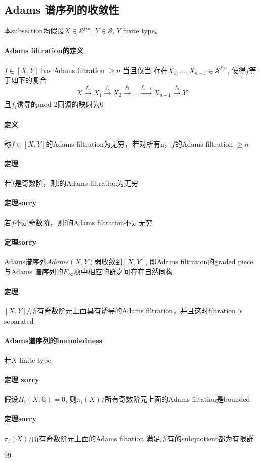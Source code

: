 \documentclass[12pt,a4paper]{article}
\begin{document}
\begin{sloppy}
\subsection{Adams 谱序列的收敛性}
本subsection均假设$X\in \mathcal{S}^{fin}$, $Y\in \mathcal{S}$, $Y$ finite type。
\paragraph{Adams filtration的定义}

$f\in [X,Y]$ has Adams filtration $\geq n$ 当且仅当
存在$X_1,\dots, X_{n-1} \in \mathcal{S}^{fin}$, 使得$f$等于如下的复合
$$X\xrightarrow[]{f_1}X_1\xrightarrow{f_2}X_2\xrightarrow[]{f_3}\dots \xrightarrow[]{f_{n-1}}X_{n-1}\xrightarrow[]{f_n}Y$$
且$f_i$诱导的mod 2同调的映射为0

\paragraph{定义}称$f\in [X,Y]$的Adams filtration为无穷，若对所有n，$f$的Adams filtration $\geq n$

\paragraph{定理}
若$f$是奇数阶，则f的Adams filtration为无穷

\paragraph{定理sorry}
若$f$不是奇数阶，则f的Adams filtration不是无穷

\paragraph{定理sorry}
Adams谱序列$Adams(X,Y)$弱收敛到$[X,Y]$, 即Adams filtration的graded piece与Adams 谱序列的$E_\infty$项中相应的群之间存在自然同构

\paragraph{定理}
$[X,Y]/\text{所有奇数阶元}$上面具有诱导的Adams filtration，并且这时filtration is separated

\paragraph{Adams谱序列的boundedness}

若$X$ finite type

\paragraph{定理 sorry}
假设$H_i(X;\mathbb{Q}) = 0$, 则$\pi_i(X)/\text{所有奇数阶元}$上面的Adams filtation是bounded

\paragraph{定理sorry}
$\pi_i(X)/\text{所有奇数阶元}$上面的Adams filtation
满足所有的subquotient都为有限群


\begin{thebibliography}{99}


\end{thebibliography}

\end{sloppy}
\end{document}
